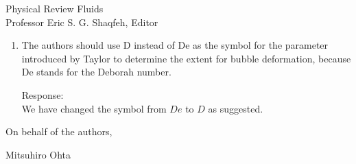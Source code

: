 \documentclass{letter}
\begin{document}
\begin{letter}{
Physical Review Fluids\\
Professor Eric S. G. Shaqfeh, Editor\\}
\begin{enumerate}
\par\noindent
\item
\textsf
{The authors should use D instead of De as the symbol for the parameter introduced by Taylor to 
determine the extent for bubble deformation, because De stands for the Deborah number.\\
}
\vspace{5 mm}

Response: \\
We have changed the symbol from $De$ to $D$ as suggested.\\

\end{enumerate}

\closing{On behalf of the authors,}
Mitsuhiro Ohta

\end{letter}
\end{document}
